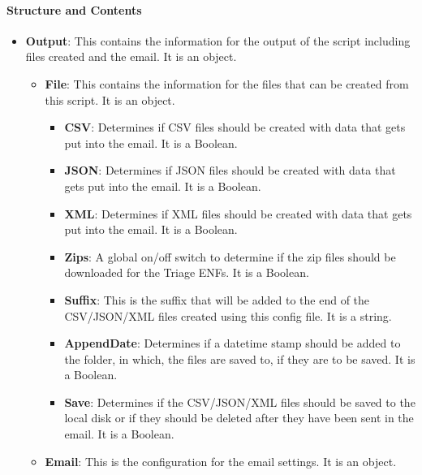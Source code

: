 \documentclass[a4paper,12pt]{report}
\begin{document}
\paragraph*{Structure and Contents}
 \par
\begin{itemize}
\item \textbf{Output}: This contains the information for the output of the script including files created and the email. It is an object. \par
\begin{itemize}
\item \textbf{File}: This contains the information for the files that can be created from this script. It is an object. \par
\begin{itemize}
\item \textbf{CSV}: Determines if CSV files should be created with data that gets put into the email. It is a Boolean. \par
\item \textbf{JSON}: Determines if JSON files should be created with data that gets put into the email. It is a Boolean. \par
\item \textbf{XML}: Determines if XML files should be created with data that gets put into the email. It is a Boolean. \par
\item \textbf{Zips}: A global on/off switch to determine if the zip files should be downloaded for the Triage ENFs. It is a Boolean. \par
\item \textbf{Suffix}: This is the suffix that will be added to the end of the CSV/JSON/XML files created using this config file. It is a string. \par
\item \textbf{AppendDate}: Determines if a datetime stamp should be added to the folder, in which, the files are saved to, if they are to be saved. It is a Boolean. \par
\item \textbf{Save}: Determines if the CSV/JSON/XML files should be saved to the local disk or if they should be deleted after they have been sent in the email. It is a Boolean. \par
\end{itemize}
\item \textbf{Email}: This is the configuration for the email settings. It is an object. \par

\end{itemize}
\end{itemize}
\end{document}
